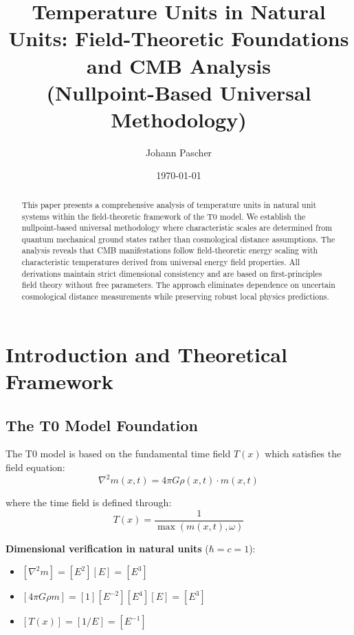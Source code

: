 \documentclass[12pt,a4paper]{article}
\newcommand{\Tfield}{T(x)}
\begin{document}
	
	\title{Temperature Units in Natural Units: Field-Theoretic Foundations and CMB Analysis \\
		(Nullpoint-Based Universal Methodology)}
	\author{Johann Pascher}
	\date{\today}
	
	\maketitle
	
	\begin{abstract}
		This paper presents a comprehensive analysis of temperature units in natural unit systems within the field-theoretic framework of the T0 model. We establish the nullpoint-based universal methodology where characteristic scales are determined from quantum mechanical ground states rather than cosmological distance assumptions. The analysis reveals that CMB manifestations follow field-theoretic energy scaling with characteristic temperatures derived from universal energy field properties. All derivations maintain strict dimensional consistency and are based on first-principles field theory without free parameters. The approach eliminates dependence on uncertain cosmological distance measurements while preserving robust local physics predictions.
	\end{abstract}
	
	\tableofcontents
	\newpage
	
	\section{Introduction and Theoretical Framework}
	\label{sec:introduction}
	
	\subsection{The T0 Model Foundation}
	\label{subsec:t0_foundation}
	
	The T0 model is based on the fundamental time field $\Tfield$ which satisfies the field equation:
	\begin{equation}
		\nabla^2 m(x,t) = 4\pi G \rho(x,t) \cdot m(x,t)
	\end{equation}
	
	where the time field is defined through:
	\begin{equation}
		\Tfield = \frac{1}{\max(m(x,t), \omega)}
	\end{equation}
	
	\textbf{Dimensional verification in natural units} ($\hbar = c = 1$):
	\begin{itemize}
		\item $[\nabla^2 m] = [E^2][E] = [E^3]$
		\item $[4\pi G \rho m] = [1][E^{-2}][E^4][E] = [E^3]$ \checkmark
		\item $[\Tfield] = [1/E] = [E^{-1}]$ \checkmark
	\end{itemize}
	
\end{document}
